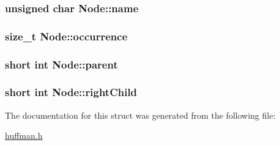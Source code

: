 \subsubsection[{\texorpdfstring{name}{name}}]{\setlength{\rightskip}{0pt plus 5cm}unsigned char Node\+::name}\hypertarget{structNode_a04eb56ff6f1e90b23ecf24eb942e917e}{}\label{structNode_a04eb56ff6f1e90b23ecf24eb942e917e}
\subsubsection[{\texorpdfstring{occurrence}{occurrence}}]{\setlength{\rightskip}{0pt plus 5cm}size\+\_\+t Node\+::occurrence}\hypertarget{structNode_ad139abad5af0b935fbb0afbb6a5687d9}{}\label{structNode_ad139abad5af0b935fbb0afbb6a5687d9}
\subsubsection[{\texorpdfstring{parent}{parent}}]{\setlength{\rightskip}{0pt plus 5cm}short int Node\+::parent}\hypertarget{structNode_aec94630f2572011a0e3640b762f754f6}{}\label{structNode_aec94630f2572011a0e3640b762f754f6}
\subsubsection[{\texorpdfstring{right\+Child}{rightChild}}]{\setlength{\rightskip}{0pt plus 5cm}short int Node\+::right\+Child}\hypertarget{structNode_a12f0113e6f72ee5d34f4f428c093f63c}{}\label{structNode_a12f0113e6f72ee5d34f4f428c093f63c}


The documentation for this struct was generated from the following file\+:\begin{DoxyCompactItemize}
\item 
\hyperlink{huffman_8h}{huffman.\+h}\end{DoxyCompactItemize}
